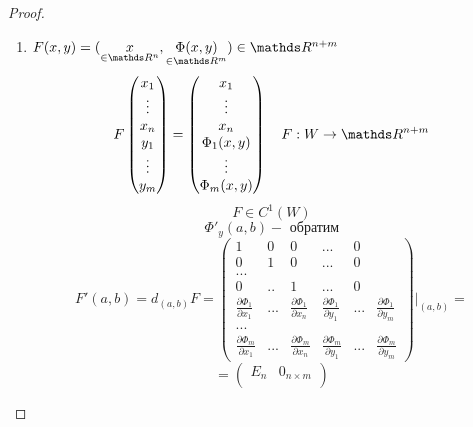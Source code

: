 \documentclass[main]{subfiles}
\begin{document}
	\begin{proof}
		\begin{enumerate}
			\item $F(x, y) = (\us{\in \R^n}{x}, \us{\in \R^m}{\Phi(x,y)}) \in \R^{n + m}$
				\[F \begin{pmatrix}
						x_1    \\
						\vdots \\
						x_n    \\
						y_1    \\
						\vdots \\
						y_m
					\end{pmatrix} =
					\begin{pmatrix}
						x_1         \\
						\vdots      \\
						x_n         \\
						\Phi_1(x,y) \\
						\vdots      \\
						\Phi_m(x, y)
					\end{pmatrix}
					\q F : W \to \R^{n + m} \]
				\[F \in C^{1}(W) \]
				\[\Phi'_y(a, b) - \text{ обратим}\]
				\[F'(a, b) = d_{(a, b)} F =
					\begin{pmatrix}
						1                                    & 0   & 0                                    & ... & 0 \\
						0                                    & 1   & 0                                    & ... & 0 \\
						...                                                                                         \\
						0                                    & ..  & 1                                    & ... & 0 \\
						\frac{\partial \Phi_1}{\partial x_1} & ... & \frac{\partial \Phi_1}{\partial x_n} &
						\frac{\partial \Phi_1}{\partial y_1} & ... & \frac{\partial \Phi_1}{\partial y_m}           \\
						...                                                                                         \\
						\frac{\partial \Phi_m}{\partial x_1} & ... & \frac{\partial \Phi_m}{\partial x_n} &
						\frac{\partial \Phi_m}{\partial y_1} & ... & \frac{\partial \Phi_m}{\partial y_m}
					\end{pmatrix} \Bigg|_{(a, b)} = \]
				\[= \begin{pmatrix}
						E_n           & 0_{n \times m} \\

\end{pmatrix}\]
\end{enumerate}
\end{proof}
\end{document}
